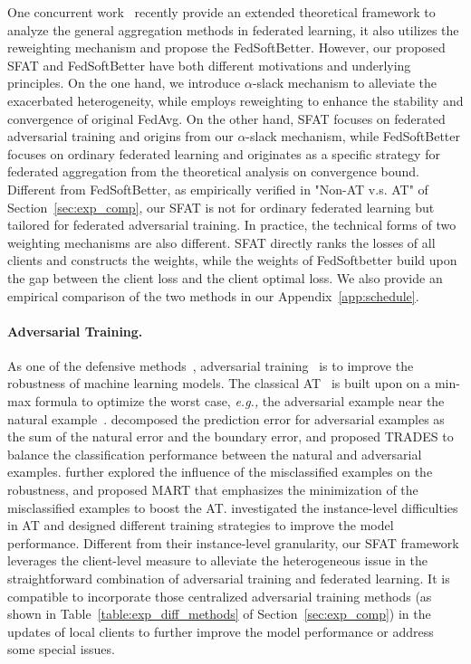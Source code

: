 \documentclass{article} %
\theoremstyle{plain}
\theoremstyle{definition}
\theoremstyle{remark}
\begin{document}
One concurrent work~\citep{mansour2022federated} recently provide an extended theoretical framework to analyze the general aggregation methods in federated learning, it also utilizes the reweighting mechanism and propose the FedSoftBetter. However, our proposed SFAT and FedSoftBetter have both different motivations and underlying principles. On the one hand, we introduce $\alpha$-slack mechanism to alleviate the exacerbated heterogeneity, while \citet{mansour2022federated} employs reweighting to enhance the stability and convergence of original FedAvg. On the other hand, SFAT focuses on federated adversarial training and origins from our $\alpha$-slack mechanism, while FedSoftBetter focuses on ordinary federated learning and originates as a specific strategy for federated aggregation from the theoretical analysis on convergence bound. Different from FedSoftBetter, as empirically verified in "Non-AT v.s. AT" of Section~\ref{sec:exp_comp}, our SFAT is not for ordinary federated learning but tailored for federated adversarial training.  In practice, the technical forms of two weighting mechanisms are also different. SFAT directly ranks the losses of all clients and constructs the weights, while the weights of FedSoftbetter build upon the gap between the client loss and the client optimal loss. We also provide an empirical comparison of the two methods in our Appendix~\ref{app:schedule}.


\paragraph{Adversarial Training.}
As one of the defensive methods~\citep{papernot2016distillation}, adversarial training~\citep{Madry_adversarial_training,Zhang_trades,jiang2020robust,chen2021robust,zhang2021geometryaware} is to improve the robustness of machine learning models. The classical AT~\citep{Madry_adversarial_training} is built upon on a min-max formula to optimize the worst case, \textit{e.g.,} the adversarial example near the natural example~\citep{Goodfellow14_Adversarial_examples}. \citet{Zhang_trades} decomposed the prediction error for adversarial examples as the sum of the natural error and the boundary error, and proposed TRADES to balance the classification performance between the natural and adversarial examples. \citet{wang2020improving_MART} further explored the influence of the misclassified examples on the robustness, and proposed MART that emphasizes the minimization of the misclassified examples to boost the AT. \citet{zhang2020fat,sanyal2020benign} investigated the instance-level difficulties in AT and designed different training strategies to improve the model performance. Different from their instance-level granularity, our SFAT framework leverages the client-level measure to alleviate the heterogeneous issue in the straightforward combination of adversarial training and federated learning. It is compatible to incorporate those centralized adversarial training methods (as shown in Table~\ref{table:exp_diff_methods} of Section~\ref{sec:exp_comp}) in the updates of local clients to further improve the model performance or address some special issues.
\end{document}
